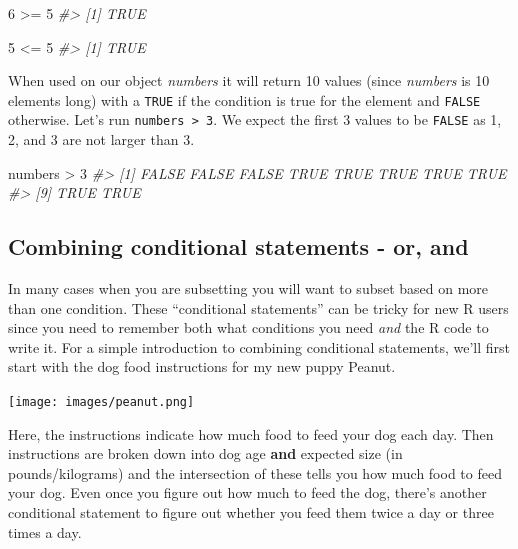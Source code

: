\documentclass[
]{krantz}
\makeatletter
\newenvironment{Shaded}{\begin{snugshade}}{\end{snugshade}}
\newcommand{\CommentTok}[1]{\textcolor[rgb]{0.37,0.37,0.37}{\textit{#1}}}
\newcommand{\DecValTok}[1]{\textcolor[rgb]{0.06,0.06,0.06}{#1}}
\newcommand{\NormalTok}[1]{#1}
\newcommand{\SpecialCharTok}[1]{\textcolor[rgb]{0,0,0}{#1}}
\newenvironment{kframe}{%
\medskip{}
\setlength{\fboxsep}{.8em}
 \def\at@end@of@kframe{}%
 \ifinner\ifhmode%
  \def\at@end@of@kframe{\end{minipage}}%
  \begin{minipage}{\columnwidth}%
 \fi\fi%
 \def\FrameCommand##1{\hskip\@totalleftmargin \hskip-\fboxsep
 \colorbox{shadecolor}{##1}\hskip-\fboxsep
     \hskip-\linewidth \hskip-\@totalleftmargin \hskip\columnwidth}%
 \MakeFramed {\advance\hsize-\width
   \@totalleftmargin\z@ \linewidth\hsize
   \@setminipage}}%
 {\par\unskip\endMakeFramed%
 \at@end@of@kframe}
\renewenvironment{Shaded}{\begin{kframe}}{\end{kframe}}
\makeatother
\begin{document}
\begin{Shaded}
\begin{Highlighting}[]
\DecValTok{6} \SpecialCharTok{\textgreater{}=} \DecValTok{5}
\CommentTok{\#\textgreater{} [1] TRUE}
\end{Highlighting}
\end{Shaded}

\begin{Shaded}
\begin{Highlighting}[]
\DecValTok{5} \SpecialCharTok{\textless{}=} \DecValTok{5}
\CommentTok{\#\textgreater{} [1] TRUE}
\end{Highlighting}
\end{Shaded}

When used on our object \emph{numbers} it will return 10 values (since \emph{numbers} is 10 elements long) with a \texttt{TRUE} if the condition is true for the element and \texttt{FALSE} otherwise. Let's run \texttt{numbers\ \textgreater{}\ 3}. We expect the first 3 values to be \texttt{FALSE} as 1, 2, and 3 are not larger than 3.

\begin{Shaded}
\begin{Highlighting}[]
\NormalTok{numbers }\SpecialCharTok{\textgreater{}} \DecValTok{3}
\CommentTok{\#\textgreater{}  [1] FALSE FALSE FALSE  TRUE  TRUE  TRUE  TRUE  TRUE}
\CommentTok{\#\textgreater{}  [9]  TRUE  TRUE}
\end{Highlighting}
\end{Shaded}

\hypertarget{combining-conditional-statements---or-and}{%
\subsection{Combining conditional statements - or, and}\label{combining-conditional-statements---or-and}}

In many cases when you are subsetting you will want to subset based on more than one condition. These ``conditional statements'' can be tricky for new R users since you need to remember both what conditions you need \emph{and} the R code to write it. For a simple introduction to combining conditional statements, we'll first start with the dog food instructions for my new puppy Peanut.

\texttt{[image: images/peanut.png]}

Here, the instructions indicate how much food to feed your dog each day. Then instructions are broken down into dog age \textbf{and} expected size (in pounds/kilograms) and the intersection of these tells you how much food to feed your dog. Even once you figure out how much to feed the dog, there's another conditional statement to figure out whether you feed them twice a day or three times a day.
\end{document}

